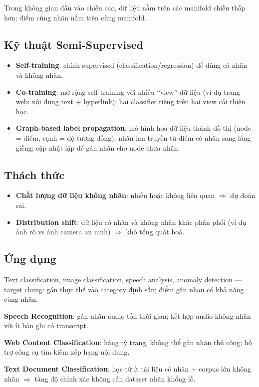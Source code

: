 \begin{ynghia}[title={Manifold Assumption}]
Trong không gian đầu vào chiều cao, dữ liệu nằm trên các manifold chiều thấp hơn; điểm cùng nhãn nằm trên cùng manifold.
\end{ynghia}

\subsection{Kỹ thuật Semi-Supervised}

\begin{phuongphap}[title={Một số kỹ thuật phổ biến}]
\begin{itemize}
  \item \textbf{Self-training}: chỉnh supervised (classification/regression) để dùng cả nhãn và không nhãn.
  \item \textbf{Co-training}: mở rộng self-training với nhiều ``view'' dữ liệu (ví dụ trang web: nội dung text + hyperlink); hai classifier riêng trên hai view cải thiện học.
  \item \textbf{Graph-based label propagation}: mô hình hoá dữ liệu thành đồ thị (node = điểm, cạnh = độ tương đồng); nhãn lan truyền từ điểm có nhãn sang láng giềng; cập nhật lặp để gán nhãn cho node chưa nhãn.
\end{itemize}
\end{phuongphap}

\subsection{Thách thức}

\begin{luuy}[title={Thách thức}]
\begin{itemize}
  \item \textbf{Chất lượng dữ liệu không nhãn}: nhiễu hoặc không liên quan $\Rightarrow$ dự đoán sai.
  \item \textbf{Distribution shift}: dữ liệu có nhãn và không nhãn khác phân phối (ví dụ ảnh rõ vs ảnh camera an ninh) $\Rightarrow$ khó tổng quát hoá.
\end{itemize}
\end{luuy}

\subsection{Ứng dụng}

\begin{phuongphap}[title={Lĩnh vực}]
Text classification, image classification, speech analysis, anomaly detection --- target chung: gán thực thể vào category định sẵn; điểm gần nhau có khả năng cùng nhãn.

\textbf{Speech Recognition}: gán nhãn audio tốn thời gian; kết hợp audio không nhãn với ít bản ghi có transcript.

\textbf{Web Content Classification}: hàng tỷ trang, không thể gán nhãn thủ công; hỗ trợ công cụ tìm kiếm xếp hạng nội dung.

\textbf{Text Document Classification}: học từ ít tài liệu có nhãn + corpus lớn không nhãn $\Rightarrow$ tăng độ chính xác không cần dataset nhãn khổng lồ.
\end{phuongphap}
